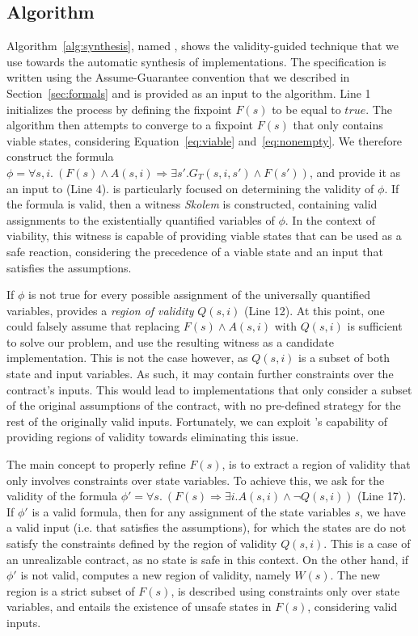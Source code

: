 \subsection{Algorithm}
\label{sec:alg}
Algorithm~\ref{alg:synthesis}, named \jsynvg, shows the validity-guided technique that we use towards the automatic synthesis of implementations. The specification is written using the Assume-Guarantee convention that we described in Section~\ref{sec:formals} and is provided as an input to the algorithm. 
Line 1 initializes the process by defining the fixpoint $F(s)$ to be equal to
$true$. The algorithm then attempts to converge to a fixpoint $F(s)$
that only contains viable states, considering Equation~\ref{eq:viable}
and~\ref{eq:nonempty}.
We therefore construct the formula $\phi = \forall s,i. \ (F(s) \land A(s,i)
\Rightarrow \exists s'. G_{T}(s,i,s') \land F(s'))$, and provide it as an input to \aeval (Line 4). \aeval is particularly
focused on determining the validity of $\phi$. If the formula is valid, then a witness
\textit{Skolem} is constructed, containing valid assignments to the
existentially quantified variables of $\phi$. In the context of viability, this
witness is capable of providing viable states that can be used as a safe
reaction, considering the precedence of a viable state and an input that
satisfies the assumptions.

If $\phi$ is not true for every possible assignment of the universally
quantified variables, \aeval provides a \textit{region of validity} $Q(s,i)$
(Line 12).
At this point, one could falsely assume that replacing $F(s) \land A(s,i)$ with
$Q(s,i)$ is sufficient to solve our problem, and use the resulting witness as a
candidate implementation. This is not the case however, as $Q(s,i)$ is a subset
of both state and input variables. As such, it may contain further constraints
over the contract's inputs. This would lead to implementations that only
consider a subset of the original assumptions of the contract, with no
pre-defined strategy for the rest of the originally valid inputs.
Fortunately, we can exploit \aeval's capability of providing regions of validity
towards eliminating this issue.

The main concept to properly refine $F(s)$, is to extract a region of validity
that only involves constraints over state variables. To achieve this, we ask for
the validity of the formula $\phi' = \forall s. \ (F(s) \Rightarrow \exists
i. A(s,i) \land \lnot Q(s,i))$ (Line 17). If $\phi'$ is a valid formula, then for
any assignment of the state variables $s$, we have a valid input (i.e. that
satisfies the assumptions), for which the states are do not satisfy the constraints defined by the region
of validity $Q(s,i)$. This is a case of an unrealizable contract, as no state is
safe in this context. On the other hand, if $\phi'$ is not valid, \aeval computes
a new region of validity, namely $W(s)$. The new region is a strict subset of
$F(s)$, is described using constraints only over state variables, and entails
the existence of unsafe states in $F(s)$, considering valid inputs.

